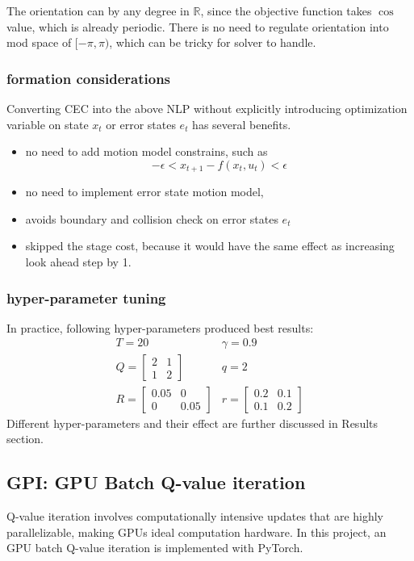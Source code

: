 \documentclass[conference]{IEEEtran}
\begin{document}
The orientation can by any degree in $\mathbb{R}$, 
since the objective function takes $\cos$ value, which is already periodic. 
There is no need to regulate orientation into mod space of $[-\pi, \pi)$, which can be tricky for solver to handle.

\subsubsection{formation considerations}
Converting CEC into the above NLP without explicitly introducing 
optimization variable on state $x_t$ or error states $e_t$ has several benefits.
\begin{itemize}
    \item no need to add motion model constrains, such as 
    \[-\epsilon < x_{t+1} - f(x_t, u_t) <\epsilon\]
    \item no need to implement error state motion model,
    \item avoids boundary and collision check on error states $e_t$
    \item skipped the stage cost, because it would have the same effect as increasing look ahead step by 1.
\end{itemize}

\subsubsection{hyper-parameter tuning}
In practice, following hyper-parameters produced best results:
\[
\begin{array}{ll}T=20&\gamma = 0.9\\ Q=\left[ \begin{matrix}2&1\\ 1&2\end{matrix}  \right] &q=2\\ R=\left[ \begin{matrix}0.05&0\\ 0&0.05\end{matrix}  \right] &r=\left[ \begin{matrix}0.2&0.1\\ 0.1&0.2\end{matrix}  \right] \end{array} 
\]
Different hyper-parameters and their effect are further discussed in Results section.

\subsection{GPI: GPU Batch Q-value iteration}
Q-value iteration involves computationally intensive updates 
that are highly parallelizable, making GPUs ideal computation hardware. 
In this project, an GPU batch Q-value iteration is implemented 
with PyTorch.
\end{document}
